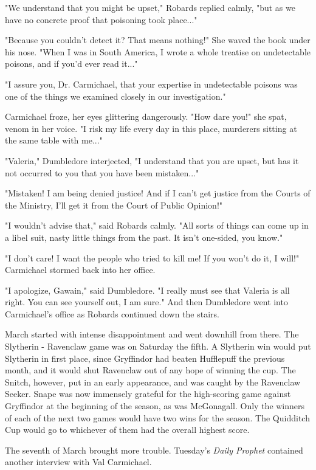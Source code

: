 "We understand that you might be upset," Robards replied calmly, "but as we have no concrete proof that poisoning took place..."

"Because you couldn't detect it? That means nothing!" She waved the book under his nose. "When I was in South America, I wrote a whole treatise on undetectable poisons, and if you'd ever read it..."

"I assure you, Dr. Carmichael, that your expertise in undetectable poisons was one of the things we examined closely in our investigation."

Carmichael froze, her eyes glittering dangerously. "How dare you!" she spat, venom in her voice. "I risk my life every day in this place, murderers sitting at the same table with me..."

"Valeria," Dumbledore interjected, "I understand that you are upset, but has it not occurred to you that you have been mistaken..."

"Mistaken! I am being denied justice! And if I can't get justice from the Courts of the Ministry, I'll get it from the Court of Public Opinion!"

"I wouldn't advise that," said Robards calmly. "All sorts of things can come up in a libel suit, nasty little things from the past. It isn't one-sided, you know."

"I don't care! I want the people who tried to kill me! If you won't do it, I will!" Carmichael stormed back into her office.

"I apologize, Gawain," said Dumbledore. "I really must see that Valeria is all right. You can see yourself out, I am sure." And then Dumbledore went into Carmichael's office as Robards continued down the stairs.

March started with intense disappointment and went downhill from there. The Slytherin - Ravenclaw game was on Saturday the fifth. A Slytherin win would put Slytherin in first place, since Gryffindor had beaten Hufflepuff the previous month, and it would shut Ravenclaw out of any hope of winning the cup. The Snitch, however, put in an early appearance, and was caught by the Ravenclaw Seeker. Snape was now immensely grateful for the high-scoring game against Gryffindor at the beginning of the season, as was McGonagall. Only the winners of each of the next two games would have two wins for the season. The Quidditch Cup would go to whichever of them had the overall highest score.

The seventh of March brought more trouble. Tuesday's \emph{Daily Prophet} contained another interview with Val Carmichael.

